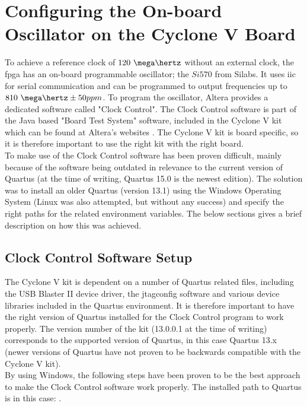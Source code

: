 \documentclass[main.tex]{subfiles}
\begin{document}
\section{Configuring the On-board Oscillator on the Cyclone V Board}

To achieve a reference clock of $120~\mega\hertz$ without an external clock, the \gls{fpga} has an on-board programmable oscillator; the $Si570$ from Silabs. It uses \gls{iic} for serial communication and can be programmed to output frequencies up to $810~\mega\hertz \pm 50 ppm$. To program the oscillator, Altera provides a dedicated software called "Clock Control". The Clock Control software is part of the Java based "Board Test System" software, included in the Cyclone V kit which can be found at Altera's websites \cite{altera_cyclonekit}. The Cyclone V kit is board specific, so it is therefore important to use the right kit with the right board.\\

To make use of the Clock Control software has been proven difficult, mainly because of the software being outdated in relevance to the current version of Quartus (at the time of writing, Quartus 15.0 is the newest edition). The solution was to install an older Quartus (version 13.1) using the Windows Operating System (Linux was also attempted, but without any success) and specify the right paths for the related environment variables. The below sections gives a brief description on how this was achieved.\\

\subsection{Clock Control Software Setup}

The Cyclone V kit is dependent on a number of Quartus related files, including the USB Blaster II device driver, the jtagconfig software and various device libraries included in the Quartus environment. It is therefore important to have the right version of Quartus installed for the Clock Control program to work properly. The version number of the kit (13.0.0.1 at the time of writing) corresponds to the supported version of Quartus, in this case Quartus 13.x (newer versions of Quartus have not proven to be backwards compatible with the Cyclone V kit).\\

By using Windows, the following steps have been proven to be the best approach to make the Clock Control software work properly. The installed path to Quartus is in this case: .\\
\end{document}
